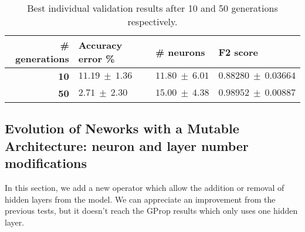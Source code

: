 \documentclass[runningheads]{llncs}
\begin{document}
\begin{table}
    \centering
    \caption{
        Best individual validation results after 10 and 50 generations
        respectively.
    }
    \label{tab:deepgprop-miniheli-validation}
    \begin{tabular}{rlll}
        \textbf{\# generations} & \textbf{Accuracy error \%} & \textbf{\# neurons} & \textbf{F2 score} \\
        \hline
        \textbf{10}             & $11.19\ \pm\ 1.36$ & $11.80\ \pm\ 6.01$ & $0.88280\ \pm\ 0.03664$ \\
        \textbf{50}             & $2.71\ \pm\ 2.30$ & $15.00\ \pm\ 4.38$ & $0.98952\ \pm\ 0.00887$ \\
    \end{tabular}
\end{table}


\subsection{Evolution of Neworks with a Mutable Architecture: neuron and layer number modifications}


In this section, we add a new operator which allow the addition or removal of
hidden layers from the model. We can appreciate %
an improvement from the
previous tests, but it doesn't reach the GProp results which only uses one
hidden layer.

\end{document}
